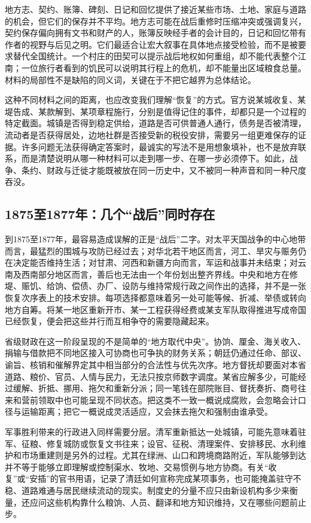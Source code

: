 地方志、契约、账簿、碑刻、日记和回忆提供了接近某些市场、土地、家庭与道路的机会，但它们的保存并不平均。地方志可能在战后重修时压缩冲突或强调复兴，契约保存偏向拥有文书和财产的人，账簿反映经手者的会计目的，日记和回忆带有作者的视野与后见之明。它们最适合让宏大叙事在具体地点接受检验，而不是被要求替代全国统计。一个村庄的田契可以提示战后地权如何重组，却不能代表整个江南；一位旅行者看到的饥民可以说明其行程上的危机，却不能量出区域粮食总量。材料的局部性不是缺陷的同义词，关键在于不把它越界为总体结论。

这种不同材料之间的距离，也应改变我们理解“恢复”的方式。官方说某城收复、某堤告成、某款解到、某项章程施行，分别是值得记住的事件，却都只是一个过程的特定截面。城镇是否得到稳定供给，道路是否可供普通人通行，债务是否被清理，流动者是否获得居处，边地社群是否接受新的税役安排，需要另一组更难保存的证据。许多问题无法获得确定答案时，最诚实的写法不是用想象填补，也不是放弃联系，而是清楚说明从哪一种材料可以走到哪一步、在哪一步必须停下。如此，战争、条约、财政与迁徙才能既被放在同一历史中，又不被同一种声音和同一种尺度吞没。

\subsection{1875至1877年：几个“战后”同时存在}

到1875至1877年，最容易造成误解的正是“战后”二字。对太平天国战争的中心地带而言，最猛烈的围城与攻防已经过去；对华北若干地区而言，河工、旱灾与赈务仍在决定能否维持生活；对甘肃、河西和新疆方向而言，军运和战事并未结束；对云南及西南部分地区而言，善后也无法由一个年份划出整齐界线。中央和地方在修堤、赈饥、给饷、偿债、办厂、设防与维持常规行政之间作出的选择，并不是一张恢复次序表上的技术安排。每项选择都意味着另一处可能等候、折减、举债或转向地方自筹。将某一地区重新开市、某一工程获得经费或某支军队取得推进写成帝国已经恢复，便会把这些并行而互相争夺的需要隐藏起来。

省级财政在这一阶段呈现的不是简单的“地方取代中央”。协饷、厘金、海关收入、捐输与借款把不同地区接入可协商也可争执的财务关系；朝廷仍通过任命、部议、谕旨、核销和催解界定其中相当部分的合法性与优先次序。地方督抚却要面对本省道路、粮价、官员、人情与民力，无法只按京师数字调度。某省应解多少，可能经过缓解、折抵、挪用、拖欠和重新分派；同一笔钱在部院账目、督抚奏折、商号往来和营前领取中也可能呈现不同状态。把这类不一致一概说成腐败，会忽略会计口径与运输距离；把它一概说成灵活适应，又会抹去拖欠和强制由谁承受。

军事胜利带来的行政进入同样需要分层。清军重新抵达一处城镇，可能先意味着驻军、征粮、修复城防或恢复文书往来；设官、征税、清理案件、安排移民、水利维护和市场重建则是另外的过程。尤其在绿洲、山口和跨境商路附近，军队能够到达并不等于能够立即理解或控制渠水、牧地、交易惯例与地方协商。有关“收复”或“安插”的官书用语，记录了清廷如何宣称完成某项事务，也可能掩盖驻守不稳、道路难通与居民继续流动的现实。制度史的分量不应只由新设机构多少来衡量，还应问这些机构靠什么粮饷、人员、翻译和地方知识维持，又在哪些问题前止步。

